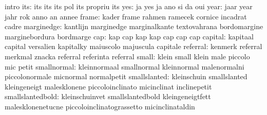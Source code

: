                            intro
                      its: its                       its
                           its                       pol
                           its                       propriu
                           its
                      yes: ja                        yes
                           ja                        ano
                           si                        da
                           oui
                     year: jaar                      year
                           jahr                      rok
                           anno                      an
                           annee
                    frame: kader                     frame
                           rahmen                    ramecek
                           cornice                   incadrat
                           cadre
               marginedge: kantlijn                  marginedge
                           marginalkante             textovahrana
                           bordomargine              marginebordura
                           bordmarge
                      cap: kap                       cap
                           kap                       kap
                           cap                       cap
                           cap
                  capital: kapitaal                  capital
                           versalien                 kapitalky
                           maiuscolo                 majuscula
                           capitale
                 referral: kenmerk                   referral
                           merkmal                   znacka
                           referral                  referinta
                           referral
                    small: klein                     small
                           klein                     male
                           piccolo                   mic
                           petit
              smallnormal: kleinnormaal              smallnormal
                           kleinnormal               malenormalni
                           piccolonormale            micnormal
                           normalpetit
             smallslanted: kleinschuin               smallslanted
                           kleingeneigt              malesklonene
                           piccoloinclinato          micinclinat
                           inclinepetit
         smallslantedbold: kleinschuinvet            smallslantedbold
                           kleingeneigtfett          malesklonenetucne
                           piccoloinclinatograssetto micinclinataldin
